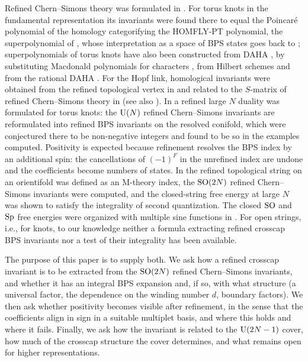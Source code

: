 Refined Chern--Simons theory was formulated in \cite{AgSh11}. For torus knots in the fundamental representation its invariants were found there to equal the Poincar\'e polynomial of the homology categorifying the HOMFLY-PT polynomial, the superpolynomial of \cite{DGR05}, whose interpretation as a space of BPS states goes back to \cite{GSV04}; superpolynomials of torus knots have also been constructed from DAHA \cite{Cherednik11}, by substituting Macdonald polynomials for characters \cite{DMMSS11}, from Hilbert schemes \cite{ORS12,GN13} and from the rational DAHA \cite{GORS12}. For the Hopf link, homological invariants were obtained from the refined topological vertex \cite{IKV07} in \cite{GIKV07} and related to the $S$-matrix of refined Chern--Simons theory in \cite{IK11} (see also \cite{MM20}). In \cite{KN17} a refined large $N$ duality was formulated for torus knots: the $\mathrm{U}(N)$ refined Chern--Simons invariants are reformulated into refined BPS invariants on the resolved conifold, which were conjectured there to be non-negative integers and found to be so in the examples computed. Positivity is expected because refinement resolves the BPS index by an additional spin: the cancellations of $(-1)^F$ in the unrefined index are undone and the coefficients become numbers of states. In \cite{AgSc12} the refined topological string on an orientifold was defined as an M-theory index, the $\mathrm{SO}(2N)$ refined Chern--Simons invariants were computed, and the closed-string free energy at large $N$ was shown to satisfy the integrality of second quantization. The closed $\mathrm{SO}$ and $\mathrm{Sp}$ free energies were organized with multiple sine functions in \cite{AM22}. For open strings, i.e., for knots, to our knowledge neither a formula extracting refined crosscap BPS invariants nor a test of their integrality has been available.

The purpose of this paper is to supply both. We ask how a refined crosscap invariant is to be extracted from the $\mathrm{SO}(2N)$ refined Chern--Simons invariants, and whether it has an integral BPS expansion and, if so, with what structure (a universal factor, the dependence on the winding number $d$, boundary factors). We then ask whether positivity becomes visible after refinement, in the sense that the coefficients align in sign in a suitable multiplet basis, and where this holds and where it fails. Finally, we ask how the invariant is related to the $\mathrm{U}(2N-1)$ cover, how much of the crosscap structure the cover determines, and what remains open for higher representations.

